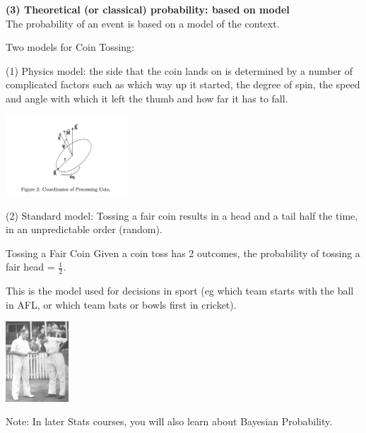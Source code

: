 \documentclass[t,xcolor=pdftex,dvipsnames,table]{beamer}
\begin{document}
\begin{frame}{}

{\bf (3) Theoretical (or classical) probability: based on model} \\
The probability of an event is based on a model of the context. 

\vspace{.5cm}
Two models for Coin Tossing: 

\vspace{.5cm}
(1) Physics model: the side that the coin lands on is determined by a number of complicated factors such as which way up it started, the degree of spin, the speed and angle with which it left the thumb and how far it has to fall.
\href{https://www.youtube.com/watch?v=AYnJv68T3MM}{} 
\href{https://www.youtube.com/watch?v=Obg7JPd6cmw}{}

\begin{center}
\includegraphics[height=3cm]{../images/CoinPhysics.jpg}
\end{center}

\end{frame}

\begin{frame}{}

(2) Standard model: Tossing a fair coin results in a head and a tail half the time, in an unpredictable order (random). 

\vspace{.5cm}
\begin{block}{Tossing a Fair Coin}
Given a coin toss has 2 outcomes, the probability of tossing a fair head =  $\frac{1}{2}$.
\end{block}

\vspace{.5cm}
This is the model used for decisions in sport (eg which team starts with the ball in AFL, or which team bats or bowls first in cricket).

\begin{center}
\includegraphics[height=3cm]{../images/BradmanAllenToss.jpg}
\end{center}

\vspace{.5cm}
{\tiny Note: In later Stats courses, you will also learn about Bayesian Probability.}

\end{frame}
\end{document}
